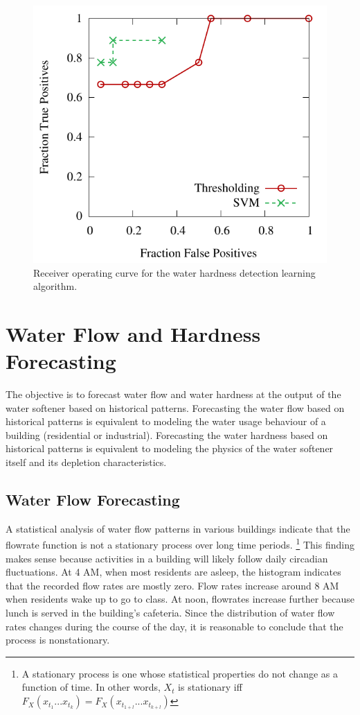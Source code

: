 \begin{figure}[t]
\centering
\includegraphics{water/hardnessroc.pdf}
\caption{Receiver operating curve for the water hardness detection learning algorithm.}
\label{fig:roc}
\end{figure}


\section{Water Flow and Hardness Forecasting}

The objective is to forecast water flow and water hardness at the output of the water softener based on historical patterns.
 Forecasting the water flow based on historical patterns is equivalent to modeling the water usage behaviour of a building (residential or industrial).
 Forecasting the water hardness based on historical patterns is equivalent to modeling the physics of the water softener itself and its depletion characteristics.

\subsection{Water Flow Forecasting}

A statistical analysis of water flow patterns in various buildings indicate that the flowrate function is not a stationary process over long time periods.
 \footnote{A stationary process is one whose statistical properties do not change as a function of time. In other words, $X_t$ is stationary iff $F_X (x_{t_1} ... x_{t_k}) = F_X (x_{t_{1+l}} ... x_{t_{k+l}})$}
 This finding makes sense because activities in a building will likely follow daily circadian fluctuations.
 At 4 AM, when most residents are asleep, the histogram indicates that the recorded flow rates are mostly zero.
 Flow rates increase around 8 AM when residents wake up to go to class.
 At noon, flowrates increase further because lunch is served in the building's cafeteria.
 Since the distribution of water flow rates changes during the course of the day, it is reasonable to conclude that the process is nonstationary.

